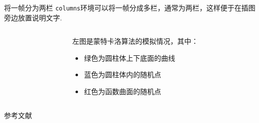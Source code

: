 \documentclass[14pt,hyperref={CJKbookmarks=true}]{beamer} %
\begin{document}
\begin{frame}{将一帧分为两栏}
	\texttt{columns}环境可以将一帧分成多栏，通常为两栏，这样便于在插图旁边放置说明文字.
	\begin{columns}[onlytextwidth]  %
		\begin{column}{0.55\textwidth}
		\end{column}
	\begin{column}{0.45\textwidth}
		左图是蒙特卡洛算法的模拟情况，其中：
		\begin{itemize}
			\item  绿色为圆柱体上下底面的曲线
			\item  蓝色为圆柱体内的随机点
			\item  红色为函数曲面的随机点
		\end{itemize}
	\end{column}
	\end{columns}
\end{frame}
\begin{frame}{参考文献}
\begin{thebibliography}{10}
	
\end{thebibliography}
\end{frame}
\end{document}

